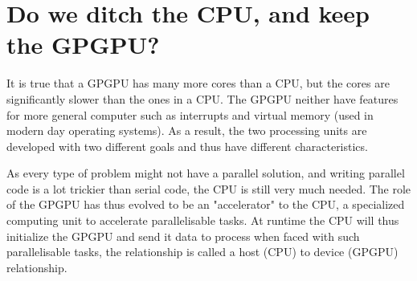 \section{Do we ditch the CPU, and keep the GPGPU?}
\label{sec:cpu vs gpu}

It is true that a GPGPU has many more cores than a CPU, but the cores are significantly slower than the ones in a CPU.
The GPGPU neither have features for more general computer such as interrupts and virtual memory (used in modern day operating systems).
As a result, the two processing units are developed with two different goals and thus have different characteristics.

As every type of problem might not have a parallel solution, and writing parallel code is a lot trickier than serial code, the CPU is still very much needed.
The role of the GPGPU has thus evolved to be an "accelerator" to the CPU, a specialized computing unit to accelerate parallelisable tasks.
At runtime the CPU will thus initialize the GPGPU and send it data to process when faced with such parallelisable tasks, the relationship is called a host (CPU) to device (GPGPU) relationship.
